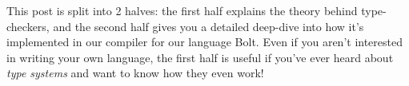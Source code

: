 %

This post is split into 2 halves: the first half explains the theory
behind type-checkers, and the second half gives you a detailed deep-dive
into how it's implemented in our compiler for our language Bolt. Even if
you aren't interested in writing your own language, the first half is
useful if you've ever heard about \emph{type systems} and want to know
how they even work!

%
%

